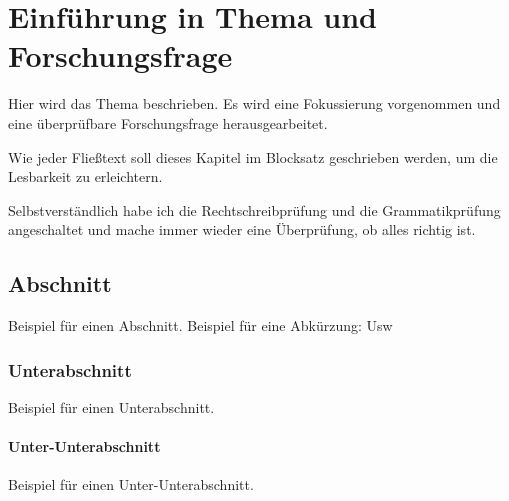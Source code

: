 %

\chapter{Einführung in Thema und Forschungsfrage}


Hier wird das Thema beschrieben. Es wird eine Fokussierung vorgenommen und eine überprüfbare Forschungsfrage herausgearbeitet.

Wie jeder Fließtext soll dieses Kapitel im Blocksatz geschrieben werden, um die Lesbarkeit zu erleichtern.

Selbstverständlich habe ich die Rechtschreibprüfung und die Grammatikprüfung angeschaltet und mache immer wieder eine Überprüfung, ob alles richtig ist.


\section{Abschnitt}

Beispiel für einen Abschnitt. \newline
Beispiel für eine Abkürzung: \gls{Usw}

\subsection{Unterabschnitt}

Beispiel für einen Unterabschnitt.

\subsubsection{Unter-Unterabschnitt}
Beispiel für einen Unter-Unterabschnitt.